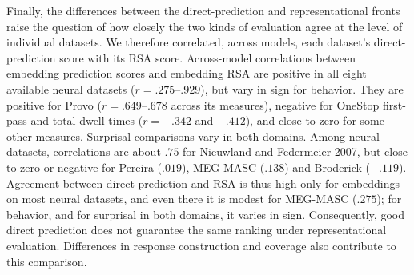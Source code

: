 Finally, the differences between the direct-prediction and representational fronts raise the question of how closely the two kinds of evaluation agree at the level of individual datasets. We therefore correlated, across models, each dataset's direct-prediction score with its RSA score. Across-model correlations between embedding prediction scores and embedding RSA are positive in all eight available neural datasets ($r=.275$--$.929$), but vary in sign for behavior. They are positive for Provo ($r=.649$--$.678$ across its measures), negative for OneStop first-pass and total dwell times ($r=-.342$ and $-.412$), and close to zero for some other measures. Surprisal comparisons vary in both domains. Among neural datasets, correlations are about $.75$ for Nieuwland and Federmeier 2007, but close to zero or negative for Pereira ($.019$), MEG-MASC ($.138$) and Broderick ($-.119$). Agreement between direct prediction and RSA is thus high only for embeddings on most neural datasets, and even there it is modest for MEG-MASC ($.275$); for behavior, and for surprisal in both domains, it varies in sign. Consequently, good direct prediction does not guarantee the same ranking under representational evaluation. Differences in response construction and coverage also contribute to this comparison.
